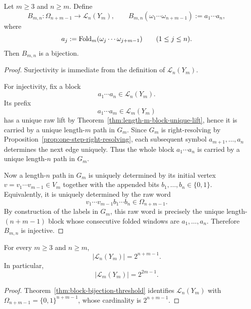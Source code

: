 \begin{theorem}
\label{thm:block-bijection-threshold}
Let $m\ge 3$ and $n\ge m$.  Define
\[
B_{m,n}:\Omega_{n+m-1}\to\mathcal L_n(Y_m),
\qquad
B_{m,n}(\omega_1\cdots\omega_{n+m-1}):=a_1\cdots a_n,
\]
where
\[
a_j:=\operatorname{Fold}_m(\omega_j\cdots\omega_{j+m-1})
\qquad (1\le j\le n).
\]
Then $B_{m,n}$ is a bijection.
\end{theorem}

\begin{proof}
Surjectivity is immediate from the definition of $\mathcal L_n(Y_m)$.

For injectivity, fix a block
\[
a_1\cdots a_n\in\mathcal L_n(Y_m).
\]
Its prefix
\[
a_1\cdots a_m\in\mathcal L_m(Y_m)
\]
has a unique raw lift by Theorem~\ref{thm:length-m-block-unique-lift}, hence it
is carried by a unique length-$m$ path in $G_m$.  Since $G_m$ is right-resolving
by Proposition~\ref{prop:one-step-right-resolving}, each subsequent symbol
$a_{m+1},\ldots,a_n$ determines the next edge uniquely.  Thus the whole block
$a_1\cdots a_n$ is carried by a unique length-$n$ path in $G_m$.

Now a length-$n$ path in $G_m$ is uniquely determined by its initial vertex
$v=v_1\cdots v_{m-1}\in V_m$ together with the appended bits
$b_1,\ldots,b_n\in\{0,1\}$.  Equivalently, it is uniquely determined by the raw
word
\[
v_1\cdots v_{m-1}b_1\cdots b_n\in\Omega_{n+m-1}.
\]
By construction of the labels in $G_m$, this raw word is precisely the unique
length-$(n+m-1)$ block whose consecutive folded windows are
$a_1,\ldots,a_n$.  Therefore $B_{m,n}$ is injective.
\end{proof}

\begin{corollary}
\label{cor:block-counts-threshold}
For every $m\ge 3$ and $n\ge m$,
\[
\lvert\mathcal L_n(Y_m)\rvert=2^{n+m-1}.
\]
In particular,
\[
\lvert\mathcal L_m(Y_m)\rvert=2^{2m-1}.
\]
\end{corollary}

\begin{proof}
Theorem~\ref{thm:block-bijection-threshold} identifies $\mathcal L_n(Y_m)$
with $\Omega_{n+m-1}=\{0,1\}^{n+m-1}$, whose cardinality is $2^{n+m-1}$.
\end{proof}

